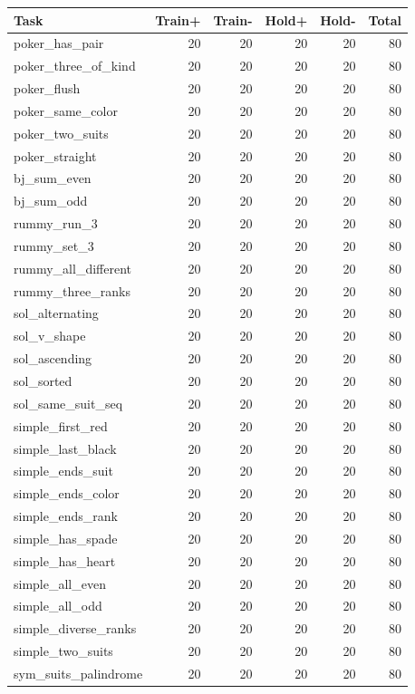 \documentclass[10pt,a4paper]{article}
\begin{document}
\begin{tabular}{lrrrrr}
\toprule
Task & Train+ & Train- & Hold+ & Hold- & Total \\
\midrule
poker\_has\_pair & 20 & 20 & 20 & 20 & 80 \\
poker\_three\_of\_kind & 20 & 20 & 20 & 20 & 80 \\
poker\_flush & 20 & 20 & 20 & 20 & 80 \\
poker\_same\_color & 20 & 20 & 20 & 20 & 80 \\
poker\_two\_suits & 20 & 20 & 20 & 20 & 80 \\
poker\_straight & 20 & 20 & 20 & 20 & 80 \\
bj\_sum\_even & 20 & 20 & 20 & 20 & 80 \\
bj\_sum\_odd & 20 & 20 & 20 & 20 & 80 \\
rummy\_run\_3 & 20 & 20 & 20 & 20 & 80 \\
rummy\_set\_3 & 20 & 20 & 20 & 20 & 80 \\
rummy\_all\_different & 20 & 20 & 20 & 20 & 80 \\
rummy\_three\_ranks & 20 & 20 & 20 & 20 & 80 \\
sol\_alternating & 20 & 20 & 20 & 20 & 80 \\
sol\_v\_shape & 20 & 20 & 20 & 20 & 80 \\
sol\_ascending & 20 & 20 & 20 & 20 & 80 \\
sol\_sorted & 20 & 20 & 20 & 20 & 80 \\
sol\_same\_suit\_seq & 20 & 20 & 20 & 20 & 80 \\
simple\_first\_red & 20 & 20 & 20 & 20 & 80 \\
simple\_last\_black & 20 & 20 & 20 & 20 & 80 \\
simple\_ends\_suit & 20 & 20 & 20 & 20 & 80 \\
simple\_ends\_color & 20 & 20 & 20 & 20 & 80 \\
simple\_ends\_rank & 20 & 20 & 20 & 20 & 80 \\
simple\_has\_spade & 20 & 20 & 20 & 20 & 80 \\
simple\_has\_heart & 20 & 20 & 20 & 20 & 80 \\
simple\_all\_even & 20 & 20 & 20 & 20 & 80 \\
simple\_all\_odd & 20 & 20 & 20 & 20 & 80 \\
simple\_diverse\_ranks & 20 & 20 & 20 & 20 & 80 \\
simple\_two\_suits & 20 & 20 & 20 & 20 & 80 \\
sym\_suits\_palindrome & 20 & 20 & 20 & 20 & 80 \\

\end{tabular}
\end{document}
